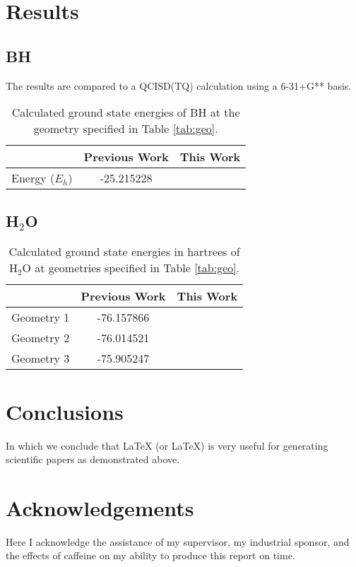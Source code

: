 \documentclass[final,3p,times,twocolumn]{elsarticle}
\begin{document}
\section{Results}
\subsection{BH} \label{sec:bhresults}
The results are compared to a QCISD(TQ) calculation using a 6-31+G** basis.\cite{cccbdb}
\begin{table}
\begin{tabular}{l|cc} \hline\hline
& Previous Work\cite{cccbdb} & This Work \\ \hline
Energy ($E_h$) & -25.215228 & \\ \hline\hline
\end{tabular}
\caption{Calculated ground state energies of BH at the geometry specified in Table \ref{tab:geo}.}
\label{tab:bhresults}
\end{table}

\subsection{H$_2$O} \label{sec:h2oresults}

\begin{table}
\begin{tabular}{l|cc} \hline\hline
& Previous Work\cite{handy-1983} & This Work \\ \hline
Geometry 1 & -76.157866 & \\ 
Geometry 2 & -76.014521 & \\
Geometry 3 & -75.905247 & \\\hline\hline
\end{tabular}
\caption{Calculated ground state energies in hartrees of H$_2$O at geometries specified in Table \ref{tab:geo}.}
\end{table}


\section{Conclusions}
\label{sect:Concl}
In which we conclude that LaTeX (or \LaTeX) is very useful for
generating scientific papers as demonstrated above.

\section*{Acknowledgements}
Here I acknowledge the assistance of my supervisor, my industrial sponsor,
and the effects of caffeine on my ability to produce this report on time.
\end{document}
